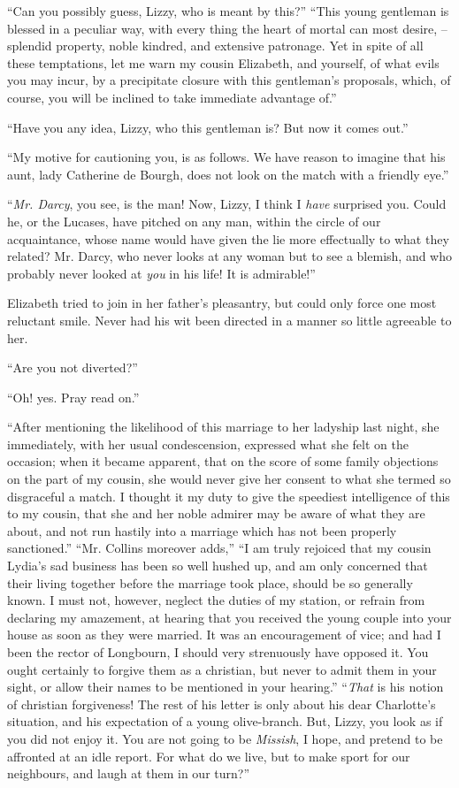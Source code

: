 “Can you possibly guess, Lizzy, who is meant by
this?” “This young gentleman is blessed in a peculiar
way, with every thing the heart of mortal can most
desire, -- splendid property, noble kindred, and extensive
patronage. Yet in spite of all these temptations, let me
warn my cousin Elizabeth, and yourself, of what evils you
may incur, by a precipitate closure with this gentleman’s
proposals, which, of course, you will be inclined to take
immediate advantage of.”

“Have you any idea, Lizzy, who this gentleman is?
But now it comes out.”

“My motive for cautioning you, is as follows. We have
reason to imagine that his aunt, lady Catherine de Bourgh,
does not look on the match with a friendly eye.”

“\textit{Mr. Darcy}, you see, is the man! Now, Lizzy, I think
I \textit{have} surprised you. Could he, or the Lucases, have
pitched on any man, within the circle of our acquaintance,
whose name would have given the lie more effectually to
what they related? Mr. Darcy, who never looks at any
woman but to see a blemish, and who probably never
looked at \textit{you} in his life! It is admirable!”

Elizabeth tried to join in her father’s pleasantry, but
could only force one most reluctant smile. Never had his
wit been directed in a manner so little agreeable to her.

“Are you not diverted?”

“Oh! yes. Pray read on.”

“After mentioning the likelihood of this marriage to
her ladyship last night, she immediately, with her usual
condescension, expressed what she felt on the occasion;
when it became apparent, that on the score of some family
objections on the part of my cousin, she would never give
her consent to what she termed so disgraceful a match.
I thought it my duty to give the speediest intelligence of
this to my cousin, that she and her noble admirer may be
aware of what they are about, and not run hastily into
a marriage which has not been properly sanctioned.”
“Mr. Collins moreover adds,” “I am truly rejoiced that
my cousin Lydia’s sad business has been so well hushed
up, and am only concerned that their living together
before the marriage took place, should be so generally
known. I must not, however, neglect the duties of my
station, or refrain from declaring my amazement, at
hearing that you received the young couple into your
house as soon as they were married. It was an encouragement
of vice; and had I been the rector of Longbourn,
I should very strenuously have opposed it. You ought
certainly to forgive them as a christian, but never to
admit them in your sight, or allow their names to be
mentioned in your hearing.” “\textit{That} is his notion of
christian forgiveness! The rest of his letter is only about
his dear Charlotte’s situation, and his expectation of a
young olive-branch. But, Lizzy, you look as if you did
not enjoy it. You are not going to be \textit{Missish}, I hope,
and pretend to be affronted at an idle report. For what
do we live, but to make sport for our neighbours, and
laugh at them in our turn?”

